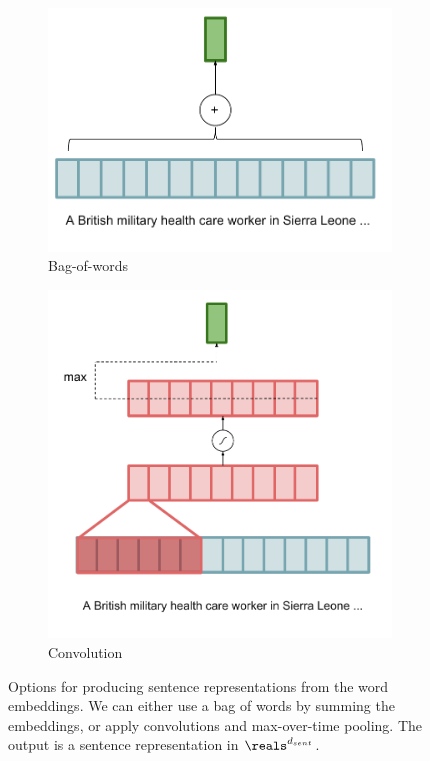 \documentclass[12pt]{report}
\begin{document}
\begin{figure}[t]
\centering
\begin{subfigure}{0.45\textwidth}
	\includegraphics[width=\textwidth]{images/bow_encoder_bow}
  \caption[Bag of Words Encoder]{Bag-of-words}
	\label{fig:bow_encoder_bow}
\end{subfigure}
\begin{subfigure}{0.45\textwidth}
	\includegraphics[width=\textwidth]{images/bow_encoder_conv}
  \caption[Convolutional Encoder]{Convolution}
	\label{fig:bow_encoder_conv}
\end{subfigure}
\caption[Sentence Representation Encoders]{Options for producing sentence representations from the word embeddings. We can either use a bag of words by summing the embeddings, or apply convolutions and max-over-time pooling. The output is a sentence representation in $\reals^{d_{sent}}$. }
\label{fig:sent_reps}
\end{figure}
\end{document}
